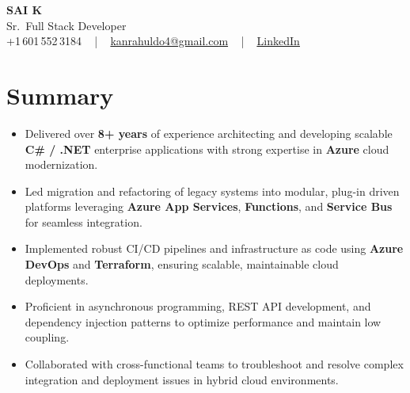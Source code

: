 \documentclass[letterpaper,11pt]{article}
\newcommand{\resumeItem}[1]{
  \item\footnotesize{
    {#1 \vspace{-2pt}}
  }
}
\newcommand{\resumeItemListStart}{\begin{itemize}[leftmargin=*]}
\newcommand{\resumeItemListEnd}{\end{itemize}\vspace{-5pt}}
\begin{document}
\begin{center}
    {\fontsize{14pt}{12pt}\selectfont \textbf{\MakeUppercase{Sai K}}}\\ \vspace{2pt}
    \fontsize{10pt}{12pt}\selectfont Sr.\ Full Stack Developer\\ \vspace{2pt}
    \fontsize{10pt}{12pt}\selectfont +1\,601\,552\,3184 ~ | ~
    \href{mailto:kanrahuldo4@gmail.com}{kanrahuldo4@gmail.com} ~ | ~
    \href{https://www.linkedin.com/in/srrrk/}{\color{blue}\underline{LinkedIn}}
    \vspace{-10pt}
\end{center}

\section{Summary}
\fontsize{9pt}{10pt}\selectfont
\resumeItemListStart
  \resumeItem{Delivered over \textbf{8+ years} of experience architecting and developing scalable \textbf{C\# / .NET} enterprise applications with strong expertise in \textbf{Azure} cloud modernization.}
  \resumeItem{Led migration and refactoring of legacy systems into modular, plug-in driven platforms leveraging \textbf{Azure App Services}, \textbf{Functions}, and \textbf{Service Bus} for seamless integration.}
  \resumeItem{Implemented robust CI/CD pipelines and infrastructure as code using \textbf{Azure DevOps} and \textbf{Terraform}, ensuring scalable, maintainable cloud deployments.}
  \resumeItem{Proficient in asynchronous programming, REST API development, and dependency injection patterns to optimize performance and maintain low coupling.}
  \resumeItem{Collaborated with cross-functional teams to troubleshoot and resolve complex integration and deployment issues in hybrid cloud environments.}
\resumeItemListEnd
\vspace{-6pt}

\end{document}
